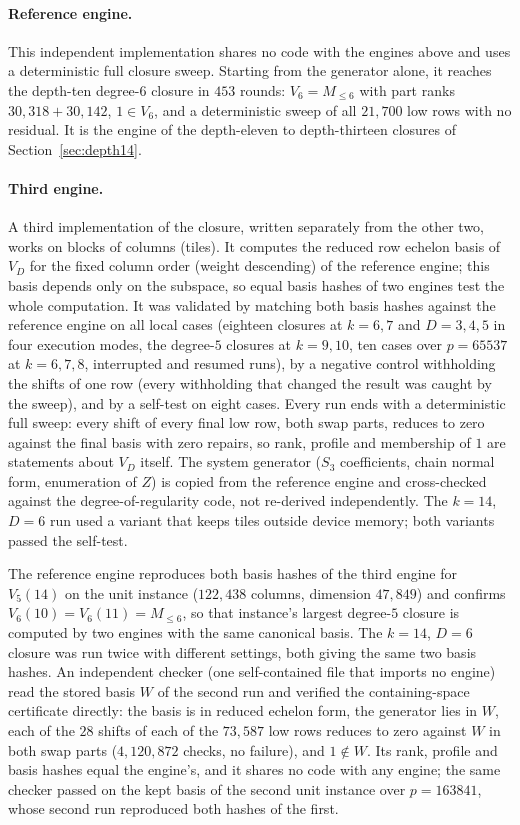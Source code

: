 \documentclass[11pt]{article}
\theoremstyle{definition}\newtheorem{definition}[theorem]{Definition}
\theoremstyle{remark}\newtheorem{remark}[theorem]{Remark}
\begin{document}
\paragraph{Reference engine.} This independent implementation shares no code with the
engines above and uses a deterministic full closure sweep. Starting from the generator
alone, it reaches the depth-ten degree-$6$ closure in $453$ rounds:
$V_6=M_{\le6}$ with part ranks $30{,}318+30{,}142$, $1\in V_6$, and a
deterministic sweep of all $21{,}700$ low rows with no residual. It is the
engine of the depth-eleven to depth-thirteen closures of
Section~\ref{sec:depth14}.

\paragraph{Third engine.} A third implementation of the closure, written
separately from the other two, works on blocks of columns (tiles). It
computes the reduced row echelon basis of $V_D$ for the fixed column order
(weight descending) of the reference engine; this basis depends only on the
subspace, so equal basis hashes of two engines test the whole computation. It
was validated by matching both basis hashes against the reference engine on
all local cases (eighteen closures at $k=6,7$ and $D=3,4,5$ in four execution
modes, the degree-$5$ closures at $k=9,10$, ten cases over $p=65537$ at
$k=6,7,8$, interrupted and resumed runs), by a negative control withholding
the shifts of one row (every withholding that changed the result was caught by
the sweep), and by a self-test on eight cases. Every run ends with a
deterministic full sweep: every shift of every final low row, both swap parts,
reduces to zero against the final basis with zero repairs, so rank, profile
and membership of $1$ are statements about $V_D$ itself. The system generator
($S_3$ coefficients, chain normal form, enumeration of $Z$) is copied from the
reference engine and cross-checked against the degree-of-regularity code, not
re-derived independently. The $k=14$, $D=6$ run used a variant that keeps
tiles outside device memory; both variants passed the self-test.

The reference engine reproduces both basis hashes of the third engine for
$V_5(14)$ on the unit instance ($122{,}438$ columns, dimension $47{,}849$) and
confirms $V_6(10)=V_6(11)=M_{\le6}$, so that instance's largest degree-$5$
closure is computed by two engines with the same canonical basis. The
$k=14$, $D=6$ closure was run twice with different settings, both giving the
same two basis hashes. An independent checker (one self-contained file that
imports no engine) read the stored basis $W$ of the second run and verified
the containing-space certificate directly: the basis is in reduced echelon
form, the generator lies in $W$, each of the $28$ shifts of each of the
$73{,}587$ low rows reduces to zero against $W$ in both swap parts
($4{,}120{,}872$ checks, no failure), and $1\notin W$. Its rank, profile and
basis hashes equal the engine's, and it shares no code with any engine; the
same checker passed on the kept basis of the second unit instance over
$p=163841$, whose second run reproduced both hashes of the first.
\end{document}
